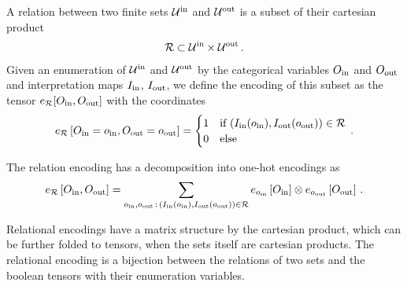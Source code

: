 \begin{definition}
	A relation between two finite sets $\mathcal{U}^{\mathrm{in}}$ and $\mathcal{U}^{\mathrm{out}}$ is a subset of their cartesian product
	\begin{align*}
		 \mathcal{R} \subset \mathcal{U}^{\mathrm{in}} \times \mathcal{U}^{\mathrm{out}} \, .
	\end{align*}
	Given an enumeration of $\mathcal{U}^{\mathrm{in}}$ and $\mathcal{U}^{\mathrm{out}}$ by the categorical variables $O_{\mathrm{in}}$ and $O_{\mathrm{out}}$ and interpretation maps $I_{\mathrm{in}}$, $I_{\mathrm{out}}$, we define the encoding of this subset as the tensor $e_{\mathcal{R}}[O_{\mathrm{in}},O_{\mathrm{out}}]$ with the coordinates
	\begin{align*}
		e_{\mathcal{R}}\left[O_{\mathrm{in}}=o_{\mathrm{in}},O_{\mathrm{out}}=o_{\mathrm{out}}\right]
		= \begin{cases}
		1 & \text{if } (I_{\mathrm{in}}(o_{\mathrm{in}}),I_{\mathrm{out}}(o_{\mathrm{out}})) \in \mathcal{R} \\
		0 & \text{else}
		\end{cases} \, . 
	\end{align*}
\end{definition}

The relation encoding has a decomposition into one-hot encodings as
\begin{align*}
	e_{\mathcal{R}}\left[O_{\mathrm{in}},O_{\mathrm{out}}\right]
	= \sum_{o_{\mathrm{in}},o_{\mathrm{out}} \, : \, (I_{\mathrm{in}}(o_{\mathrm{in}}),I_{\mathrm{out}}(o_{\mathrm{out}})) \in \mathcal{R}}
	e_{o_{\mathrm{in}}}\left[O_{\mathrm{in}}\right]  \otimes e_{o_{\mathrm{out}}}\left[O_{\mathrm{out}}\right]  \, .
\end{align*}

Relational encodings have a matrix structure by the cartesian product, which can be further folded to tensors, when the sets itself are cartesian products.
The relational encoding is a bijection between the relations of two sets and the boolean tensors with their enumeration variables.

%



